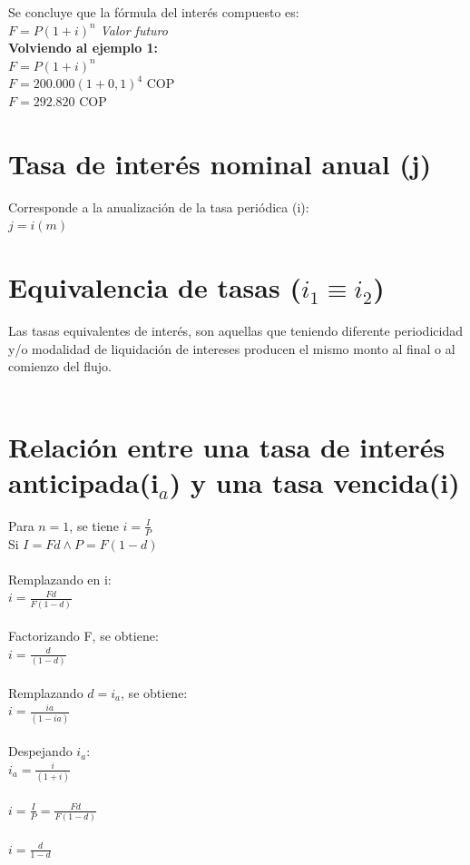 Se concluye que la fórmula del interés compuesto es:\\
$F = P(1+i)^n$ \hspace{0.3 cm} \textit{Valor futuro}\\

\textbf{Volviendo al ejemplo 1:}\\
$F = P(1+i)^n$\\
$F =  200{.}000 (1+0,1)^4$ COP\\
$F =  292{.}820$ COP\\

\clearpage



\section{Tasa de interés nominal anual (j)}
Corresponde a la anualización de la tasa periódica (i):\\
$j = i(m)$ \\




\section{Equivalencia de tasas ($i_{1} \equiv i_{2}$)}
Las tasas equivalentes de interés,  son aquellas que teniendo diferente periodicidad y/o 
modalidad de liquidación de intereses producen el mismo monto al final o al comienzo del flujo.\\
\\


\section{Relación entre una tasa de interés anticipada(i$_{a}$) y una tasa vencida(i)}
Para $n = 1$, se tiene
$i = \frac{I}{P}$ \\
Si $I = F  d \land P = F (1 -d)$ \\\\
Remplazando en i: \\
$i = \frac {F d} {F (1-d)}$\\\\
Factorizando F,  se obtiene: \\
$i = \frac{d}{(1 - d)}$\\\\
Remplazando $d = i_{a} $, se obtiene: \\
$i = \frac{ia}{(1 - ia)}$\\\\
Despejando $i_{a}$: \\
$i_{a} = \frac{i}{(1+i)}$ \\\\
$i = \frac{I}{P} = \frac{F d}{F(1-d)}$\\\\
$i = \frac{d}{1-d}$\\

